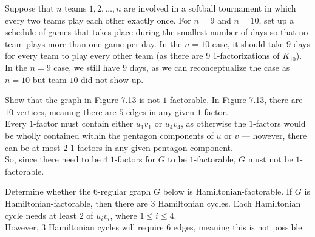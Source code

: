 \documentclass[8pt]{extarticle}
\title{}
\author{Avinash Iyer}
\date{}
\begin{document}
  \begin{problem}{12}
    Suppose that $n$ teams $1,2,\dots,n$ are involved in a softball tournament in which every two teams play each other exactly once. For $n=9$ and $n=10$, set up a schedule of games that takes place during the smallest number of days so that no team plays more than one game per day.
    \tcblower
    In the $n=10$ case, it should take $9$ days for every team to play every other team (as there are 9 1-factorizations of $K_{10}$).\\

    In the $n=9$ case, we still have $9$ days, as we can reconceptualize the case as $n=10$ but team $10$ did not show up.
  \end{problem}
  \begin{problem}{13}
    Show that the graph in Figure 7.13 is not $1$-factorable.
    \tcblower
    In Figure 7.13, there are $10$ vertices, meaning there are $5$ edges in any given $1$-factor.\\

    Every $1$-factor must contain either $u_1v_1$ or $u_4v_4$, as otherwise the $1$-factors would be wholly contained within the pentagon components of $u$ or $v$ --- however, there can be at most $2$ $1$-factors in any given pentagon component.\\

    So, since there need to be $4$ $1$-factors for $G$ to be $1$-factorable, $G$ must not be $1$-factorable.
  \end{problem}
  \begin{problem}{15}
    Determine whether the $6$-regular graph $G$ below is Hamiltonian-factorable.
    \tcblower
    If $G$ is Hamiltonian-factorable, then there are $3$ Hamiltonian cycles. Each Hamiltonian cycle needs at least $2$ of $u_iv_i$, where $1\leq i\leq 4$.\\

    However, $3$ Hamiltonian cycles will require $6$ edges, meaning this is not possible.
  \end{problem}
\end{document}
